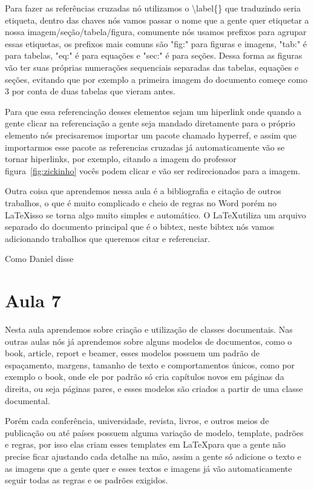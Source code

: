 Para fazer as referências cruzadas nó utilizamos o \textbackslash label\{\} que traduzindo seria etiqueta, dentro das chaves nós vamos passar o nome que a gente quer etiquetar a nossa imagem/seção/tabela/figura, comumente nós usamos prefixos para agrupar essas etiquetas, os prefixos mais comuns são "fig:" para figuras e imagens, "tab:" é para tabelas, "eq:" é para equações e "sec:" é para seções. Dessa forma as figuras vão ter suas próprias numerações sequenciais separadas das tabelas, equações e seções, evitando que por exemplo a primeira imagem do documento começe como 3 por conta de duas tabelas que vieram antes.

Para que essa referenciação desses elementos sejam um hiperlink onde quando a gente clicar na referenciação a gente seja mandado diretamente para o próprio elemento nós precisaremos importar um pacote chamado hyperref, e assim que importarmos esse pacote as referencias cruzadas já automaticamente vão se tornar hiperlinks, por exemplo, citando a imagem do professor figura~\ref{fig:zickinho} vocês podem clicar e vão ser redirecionados para a imagem.

Outra coisa que aprendemos nessa aula é a bibliografia e citação de outros trabalhos, o que é muito complicado e cheio de regras no Word porém no \LaTeX isso se torna algo muito simples e automático. O \LaTeX utiliza um arquivo separado do documento principal que é o bibtex, neste bibtex nós vamos adicionando trabalhos que queremos citar e referenciar.

Como Daniel disse~\cite{michels2025real}
\section{Aula 7}
Nesta aula aprendemos sobre criação e utilização de classes documentais. Nas outras aulas nós já aprendemos sobre alguns modelos de documentos, como o book, article, report e beamer, esses modelos possuem um padrão de espaçamento, margens, tamanho de texto e comportamentos únicos, como por exemplo o book, onde ele por padrão só cria capítulos novos em páginas da direita, ou seja páginas pares, e esses modelos são criados a partir de uma classe documental.

Porém cada conferência, universidade, revista, livros, e outros meios de publicação ou até países possuem alguma variação de modelo, template, padrões e regras, por isso elas criam esses templates em \LaTeX  para que a gente não precise ficar ajustando cada detalhe na mão, assim a gente só adicione o texto e as imagens que a gente quer e esses textos e imagens já vão automaticamente seguir todas as regras e os padrões exigidos.

